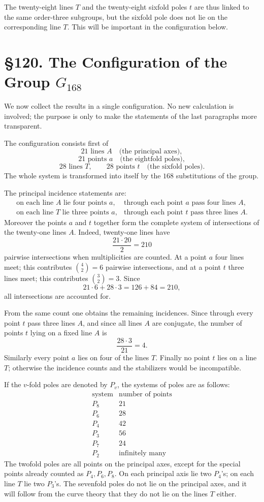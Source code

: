 \documentclass[11pt,a4paper]{book}
\newcommand{\webersection}[2]{\clearpage\section*{\S #1. #2}}
\begin{document}
The twenty-eight lines \(T\) and the twenty-eight sixfold poles \(t\) are thus linked to the same order-three subgroups, but the sixfold pole does not lie on the corresponding line \(T\).  This will be important in the configuration below.

\webersection{120}{The Configuration of the Group \(G_{168}\)}

We now collect the results in a single configuration.  No new calculation is involved; the purpose is only to make the statements of the last paragraphs more transparent.

The configuration consists first of
\[
21\text{ lines }A\quad\text{(the principal axes)},
\]
\[
21\text{ points }a\quad\text{(the eightfold poles)},
\]
\[
28\text{ lines }T,
\qquad
28\text{ points }t\quad\text{(the sixfold poles)}.
\]
The whole system is transformed into itself by the \(168\) substitutions of the group.

The principal incidence statements are:
\[
\begin{array}{ll}
\text{on each line }A\text{ lie four points }a, &
\text{through each point }a\text{ pass four lines }A,\\[2mm]
\text{on each line }T\text{ lie three points }a, &
\text{through each point }t\text{ pass three lines }A.
\end{array}
\]
Moreover the points \(a\) and \(t\) together form the complete system of intersections of the twenty-one lines \(A\).  Indeed, twenty-one lines have
\[
 \frac{21\cdot20}{2}=210
\]
pairwise intersections when multiplicities are counted.  At a point \(a\) four lines meet; this contributes \(\binom{4}{2}=6\) pairwise intersections, and at a point \(t\) three lines meet; this contributes \(\binom{3}{2}=3\).  Since
\[
 21\cdot6+28\cdot3=126+84=210,
\]
all intersections are accounted for.

From the same count one obtains the remaining incidences.  Since through every point \(t\) pass three lines \(A\), and since all lines \(A\) are conjugate, the number of points \(t\) lying on a fixed line \(A\) is
\[
 \frac{28\cdot3}{21}=4.
\]
Similarly every point \(a\) lies on four of the lines \(T\).  Finally no point \(t\) lies on a line \(T\); otherwise the incidence counts and the stabilizers would be incompatible.

If the \(v\)-fold poles are denoted by \(P_v\), the systems of poles are as follows:
\[
\begin{array}{c|c}
\text{system} & \text{number of points}\\ \hline
P_8 & 21\\
P_6 & 28\\
P_4 & 42\\
P_3 & 56\\
P_7 & 24\\
P_2 & \text{infinitely many}
\end{array}
\]
The twofold poles are all points on the principal axes, except for the special points already counted as \(P_4,P_6,P_8\).  On each principal axis lie two \(P_4\)'s; on each line \(T\) lie two \(P_3\)'s.  The sevenfold poles do not lie on the principal axes, and it will follow from the curve theory that they do not lie on the lines \(T\) either.
\end{document}
